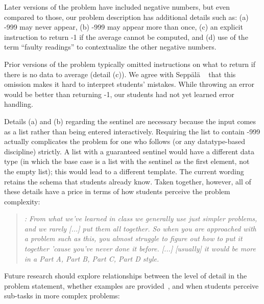\noindent
Later versions of the problem have included negative numbers, but even
compared to those, our problem description has additional details such
as: (a) -999 may never appear, (b) -999 may appear more than once, (c)
an explicit instruction to return -1 if the average cannot be
computed, and (d) use of the term ``faulty readings'' to contextualize
the other negative numbers.

Prior versions of the problem typically omitted instructions on what to 
return if there is no data to average (detail (c)).  We agree with
Sepp\"{a}l\"{a} \etal~\cite{seppala-how-hard-rainfall-koli15} that this omission makes it hard to
interpret students' mistakes. While throwing an
error would be better than returning -1, our students had not yet learned
error handling.

Details (a) and (b) regarding the sentinel are necessary because the
input comes as a list rather than being entered
interactively. Requiring the list to contain -999 actually complicates
the problem for one who follows \htdp 
(or any datatype-based discipline)
strictly.  A list with a guaranteed sentinel would have a different
data type (in which the base case is a list with the sentinel as the
first element, not the empty list); this would lead to a different
template. The current wording retains the schema that
students already know. Taken together, however, all of these details have a price in
terms of how students perceive the problem complexity:


\begin{quote}\it
\sseven: From what we've learned in class we generally use just simpler
problems, and we rarely [...]
put them all together. So
when you are approached with a problem such as this, you almost
struggle to figure out how to put it together 'cause you've never done
it before. [...] [usually]
it would be
more in a Part A, Part B, Part C, Part D style.
\end{quote}
 
\noindent
Future research should explore relationships between the
level of detail in the problem statement, whether examples are
provided~\cite{seppala-how-hard-rainfall-koli15}, and when 
students perceive sub-tasks in more complex problems:

